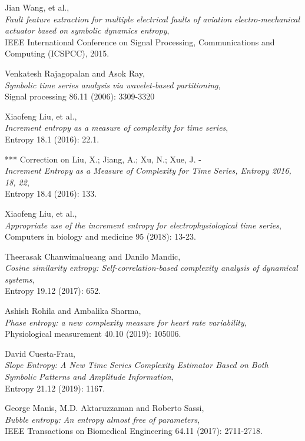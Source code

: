 \documentclass[12pt, a4paper, titlepage, openany]{book}
\begin{document}
\begin{thebibliography}{9}
Jian Wang, et al.,\\
\emph{Fault feature extraction for multiple electrical faults of aviation electro-mechanical actuator based on symbolic dynamics entropy},\\
IEEE International Conference on Signal Processing, Communications and Computing (ICSPCC), 2015.
 
Venkatesh Rajagopalan and Asok Ray,\\
\emph{Symbolic time series analysis via wavelet-based partitioning},\\
Signal processing 86.11 (2006): 3309-3320

Xiaofeng Liu, et al.,\\
\emph{Increment entropy as a measure of complexity for time series},\\
Entropy 18.1 (2016): 22.1.

***  Correction on Liu, X.; Jiang, A.; Xu, N.; Xue, J. -\\
\emph{Increment Entropy as a Measure of Complexity for Time Series,  Entropy 2016, 18, 22},\\
Entropy 18.4 (2016): 133.

Xiaofeng Liu, et al.,\\
\emph{Appropriate use of the increment entropy for electrophysiological time series},\\
Computers in biology and medicine 95 (2018): 13-23.

Theerasak Chanwimalueang and Danilo Mandic,\\
\emph{Cosine similarity entropy: Self-correlation-based complexity analysis of dynamical systems},\\
Entropy 19.12 (2017): 652.

Ashish Rohila and Ambalika Sharma,\\
\emph{Phase entropy: a new complexity measure for heart rate  variability},\\
Physiological measurement 40.10 (2019): 105006.

David Cuesta-Frau,\\
\emph{Slope Entropy: A New Time Series Complexity Estimator Based on Both Symbolic Patterns and Amplitude Information},\\
Entropy 21.12 (2019): 1167.

George Manis, M.D. Aktaruzzaman and Roberto Sassi,\\
\emph{Bubble entropy: An entropy almost free of parameters},\\
IEEE Transactions on Biomedical Engineering  64.11 (2017): 2711-2718.


\end{thebibliography}
\end{document}
